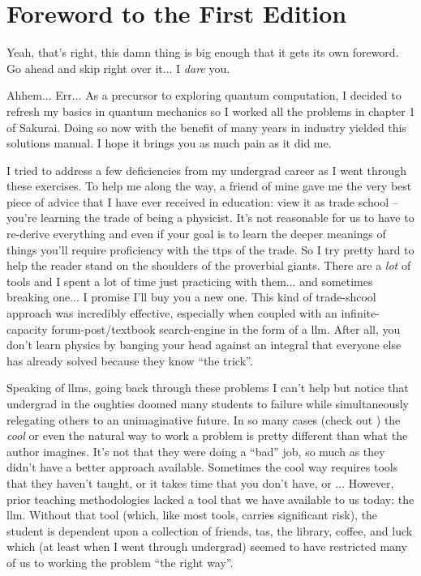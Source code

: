 \chapter{Foreword to the First Edition}

Yeah, that's right, this damn thing is big enough that it gets its own
foreword.  Go ahead and skip right over it... I \emph{dare} you.

Ahhem... Err...  As a precursor to exploring quantum computation, I
decided to refresh my basics in quantum mechanics so I worked all the
problems in chapter 1 of Sakurai.  Doing so now with the benefit of
many years in industry yielded this solutions manual.  I hope it
brings you as much pain as it did me.

I tried to address a few deficiencies from my undergrad career as I
went through these exercises.  To help me along the way, a friend of
mine gave me the very best piece of advice that I have ever received
in education: view it as trade school -- you're learning the trade of
being a physicist.  It's not reasonable for us to have to re-derive
everything and even if your goal is to learn the deeper meanings of
things you'll require proficiency with the \acp{ttp} of the trade.  So
I try pretty hard to help the reader stand on the shoulders of the
proverbial giants.  There are a \emph{lot} of tools and I spent a lot
of time just practicing with them... and sometimes breaking one... I
promise I'll buy you a new one.  This kind of trade-shcool approach
was incredibly effective, especially when coupled with an
infinite-capacity forum-post/textbook search-engine in the form of a
\ac{llm}.  After all, you don't learn physics by banging your head
against an integral that everyone else has already solved because they
know ``the trick''.

Speaking of \acp{llm}, going back through these problems I can't help
but notice that undergrad in the oughties doomed many students to
failure while simultaneously relegating others to an unimaginative
future.  In so many cases (check out ) the
\emph{cool} or even the natural way to work a problem is pretty
different than what the author imagines.  It's not that they were
doing a ``bad'' job, so much as they didn't have a better approach
available.  Sometimes the cool way requires tools that they haven't
taught, or it takes time that you don't have, or ...  However, prior
teaching methodologies lacked a tool that we have available to us
today: the \ac{llm}.  Without that tool (which, like most tools,
carries significant risk), the student is dependent upon a collection
of friends, \acp{ta}, the library, coffee, and luck which (at least
when I went through undergrad) seemed to have restricted many of us to
working the problem ``the right way''.

